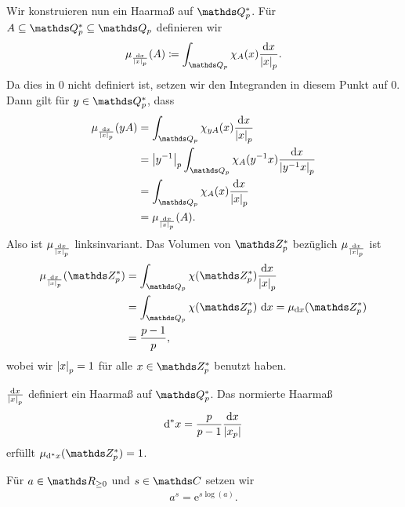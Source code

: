 Wir konstruieren nun ein Haarmaß auf $\Q_p^\ast$.
Für $A \subseteq \Q_p^\ast\subseteq \Q_p$ definieren wir
\begin{align*}
\mu_{\frac{\mathrm{d}x}{\abs{x}_p}}(A)\coloneqq \int_{\Q_p} \chi_A(x)\frac{\mathrm{d}x}{\abs{x}_p}.
\end{align*}
Da dies in $0$ nicht definiert ist, setzen wir den Integranden in diesem Punkt auf $0$.
Dann gilt für $y\in \Q_p^\ast$, dass
\begin{align*}
\mu_{\frac{\mathrm{d}x}{\abs{x}_p}}(yA)&=\int_{\Q_p} \chi_{yA}(x)\frac{\mathrm{d}x}{\abs{x}_p}\\
&=\abs{y^{-1}}_p \int_{\Q_p}\chi_A(y^{-1}x)\frac{\mathrm{d}x}{\abs{y^{-1}x}_p}\\
&=\int_{\Q_p} \chi_A(x)\frac{\mathrm{d}x}{\abs{x}_p}\\
&=\mu_{\frac{\mathrm{d}x}{\abs{x}_p}}(A).
\end{align*}
Also ist $\mu_{\frac{\mathrm{d}x}{\left\vert x\right\vert_p}}$ linksinvariant.
Das Volumen von $\Z_p^\ast$ bezüglich $\mu_{\frac{\mathrm{d}x}{\left\vert x\right\vert_p}}$ ist
\begin{align*}
\mu_{\frac{\mathrm{d}x}{\abs{x}_p}}(\Z_p^\ast)&=\int_{\Q_p}\chi(\Z_p^\ast) \frac{\mathrm{d}x}{\abs{x}_p}\\
&=\int_{\Q_p}\chi(\Z_p^\ast)~\mathrm{d}x=\mu_{\mathrm{d}x}(\Z_p^\ast)\\
&=\frac{p-1}{p},
\end{align*}
wobei wir $\left\vert x\right\vert_p=1$ für alle $x\in \Z_p^\ast$ benutzt haben.


\begin{thm}
${\frac{\mathrm{d}x}{\left\vert x\right\vert_p}}$ definiert ein Haarmaß auf $\Q_p^\ast$.
Das normierte Haarmaß
\begin{align*}
\mathrm{d}^\ast x =\frac{p}{p-1}{\frac{\mathrm{d}x}{\left\vert x_p\right\vert}}
\end{align*}
erfüllt $\mu_{\mathrm{d}^\ast x}(\Z_p^\ast)=1$.
\end{thm}

Für $a \in \R_{\geq 0}$ und $s\in \C$ setzen wir
\begin{align*}
a^s=\mathrm{e}^{s \log(a)}.
\end{align*}

